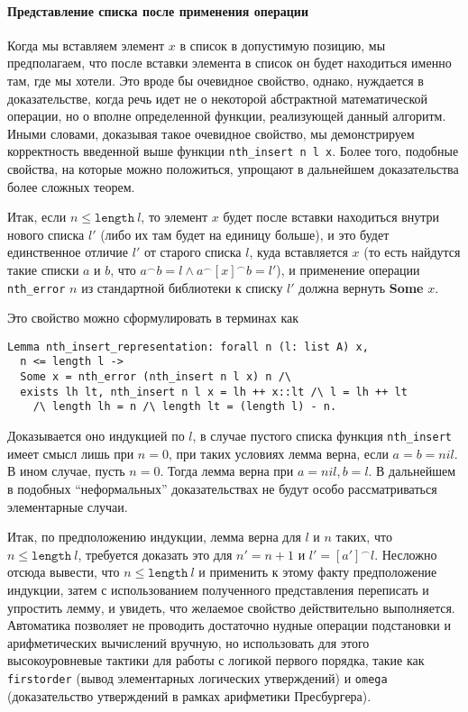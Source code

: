 \paragraph{Представление списка после применения операции} Когда мы вставляем элемент $x$ в список в допустимую позицию, мы предполагаем, что после вставки элемента в список он будет находиться именно там, где мы хотели. Это вроде бы очевидное свойство, однако, нуждается в доказательстве, когда речь идет не о некоторой абстрактной математической операции, но о вполне определенной функции, реализующей данный алгоритм. Иными словами, доказывая такое очевидное свойство, мы демонстрируем корректность введенной выше функции \texttt{nth\_insert n l x}. Более того, подобные свойства, на которые можно положиться, упрощают в дальнейшем доказательства более сложных теорем.

Итак, если $n \leq \texttt{length}\ l$, то элемент $x$ будет после вставки находиться внутри нового списка $l'$ (либо их там будет на единицу больше), и это будет единственное отличие $l'$ от старого списка $l$, куда вставляется $x$ (то есть найдутся такие списки $a$ и $b$, что $a^\frown  b = l \wedge a^\frown [x]^\frown b = l'$),  и применение операции \texttt{nth\_error} $n$ из стандартной библиотеки к списку $l'$ должна вернуть \textbf{Some} $x$.

Это свойство можно сформулировать в терминах \tcoq как
\begin{lstlisting}
Lemma nth_insert_representation: forall n (l: list A) x,
  n <= length l ->
  Some x = nth_error (nth_insert n l x) n /\
  exists lh lt, nth_insert n l x = lh ++ x::lt /\ l = lh ++ lt
    /\ length lh = n /\ length lt = (length l) - n.
 \end{lstlisting}

Доказывается оно индукцией по $l$, в случае пустого списка функция \texttt{nth\_insert} имеет смысл лишь при $n = 0$, при таких условиях лемма верна, если $a = b = nil$. В ином случае, пусть $n = 0$. Тогда лемма верна при $a = nil, b = l$. В дальнейшем в подобных ``неформальных''  доказательствах не будут особо рассматриваться элементарные случаи.

Итак, по предположению индукции, лемма верна для $l$ и $n$ таких, что $n \leq \texttt{length}\ l$, требуется доказать это для $n' = n + 1$ и $l' = [a']^\frown l$. Несложно отсюда вывести, что $n \leq \texttt{length}\ l$ и применить к этому факту предположение индукции, затем с использованием полученного представления переписать и упростить лемму, и увидеть, что желаемое свойство действительно выполняется. Автоматика \tcoq позволяет не проводить достаточно нудные операции подстановки и арифметических вычислений вручную, но использовать для этого высокоуровневые тактики для работы с логикой первого порядка, такие как \texttt{firstorder} (вывод элементарных логических утверждений) и \texttt{omega} (доказательство утверждений в рамках арифметики Пресбургера).

